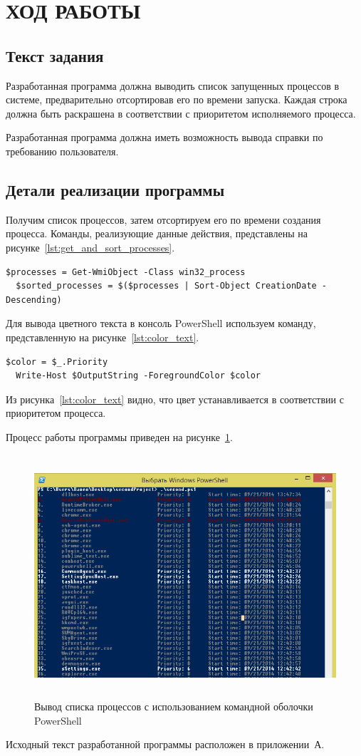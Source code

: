 \section{ХОД РАБОТЫ}

\subsection{Текст задания}

Разработанная программа должна выводить список запущенных процессов в системе,
предварительно отсортировав его по времени запуска. Каждая строка
должна быть раскрашена в соответствии с приоритетом исполняемого процесса.

Разработанная программа должна иметь возможность вывода справки по требованию пользователя.

\subsection{Детали реализации программы}

Получим список процессов, затем отсортируем его по времени создания процесса.
Команды, реализующие данные действия, представлены на рисунке~\ref{lst:get_and_sort_processes}.

\begin{lstlisting}[caption=Получение и сортировка списка запущенных процессов, label=lst:get_and_sort_processes]
  $processes = Get-WmiObject -Class win32_process
  $sorted_processes = $($processes | Sort-Object CreationDate -Descending)
\end{lstlisting}

Для вывода цветного текста в консоль PowerShell используем команду, представленную на рисунке~\ref{lst:color_text}.
\begin{lstlisting}[caption=Вывод цветного текста в консоль PowerShell, label=lst:color_text]
  $color = $_.Priority
  Write-Host $OutputString -ForegroundColor $color
\end{lstlisting}

Из рисунка~\ref{lst:color_text} видно, что цвет устанавливается в соответствии с приоритетом процесса.

\newpage
Процесс работы программы приведен на рисунке~\ref{fig:process}.

\begin{figure}[htbp]
  \centering
  \includegraphics[width=150mm,height=90mm]{img/process}
  \caption{Вывод списка процессов с использованием командной оболочки PowerShell}\label{fig:process}
\end{figure}

Исходный текст разработанной программы расположен в приложении~А.

\newpage
